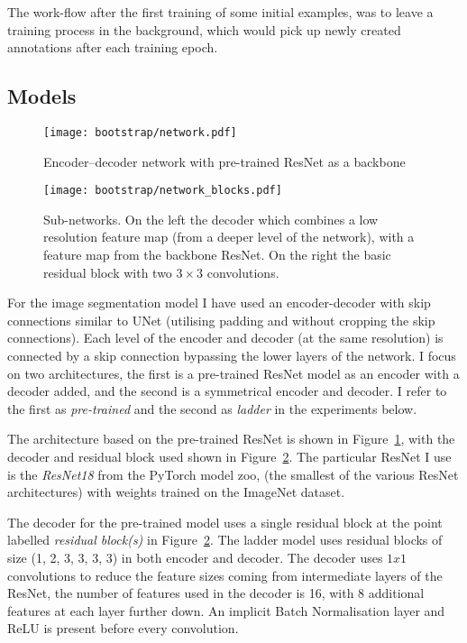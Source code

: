 The work-flow after the first training of some initial  examples, was to leave a training process in the background, which would pick up newly created annotations after each training epoch. 


\subsection {Models}

\begin{figure}[h]
  \centering
  \texttt{[image: bootstrap/network.pdf]}
  \caption{Encoder--decoder network with pre-trained ResNet as a backbone}  
  \label{fig:bootstrap_network}
\end{figure}
\begin{figure}
  \centering
  \texttt{[image: bootstrap/network\_blocks.pdf]}
  \caption{Sub-networks. On the left the decoder which combines a low resolution feature map (from a deeper level of the network), with a feature map from the backbone ResNet. On the right the basic residual block with two $3\times3$ convolutions. }  
  \label{fig:bootstrap_decode_block}
\end{figure}

For the image segmentation model I have used an encoder-decoder with skip connections similar to UNet \cite{Ronneberger2015} (utilising padding and without cropping the skip connections). Each level of the encoder and decoder (at the same resolution) is connected by a skip connection bypassing the lower layers of the network. I focus on two architectures, the first is a pre-trained ResNet model as an encoder with a decoder added, and the second is a symmetrical encoder and decoder. I refer to the first as \emph{pre-trained} and the second as \emph{ladder} in the experiments below.

The architecture based on the pre-trained ResNet \cite{He} is shown in Figure~\ref{fig:bootstrap_network}, with the decoder and residual block used shown in Figure~\ref{fig:bootstrap_decode_block}. The particular ResNet I use is the \emph{ResNet18} from the PyTorch \cite{Paszke2017} model zoo, (the smallest of the various ResNet architectures) with weights trained on the ImageNet dataset. 

The decoder for the pre-trained model uses a single residual block at the point labelled \emph{residual block(s)} in Figure~\ref{fig:bootstrap_decode_block}. The ladder model uses residual blocks of size (1, 2, 3, 3, 3, 3) in both encoder and decoder. The decoder uses $ 1x1 $ convolutions to reduce the feature sizes coming from intermediate layers of the ResNet, the number of features used in the decoder is 16, with 8 additional features at each layer further down. An implicit Batch Normalisation layer and ReLU is present before every convolution.

